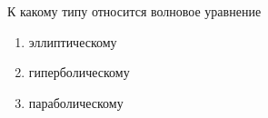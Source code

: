 К какому типу относится волновое уравнение

\begin{enumerate}[label=\arabic*)]
    \item эллиптическому
    \item гиперболическому
    \item параболическому
\end{enumerate}

